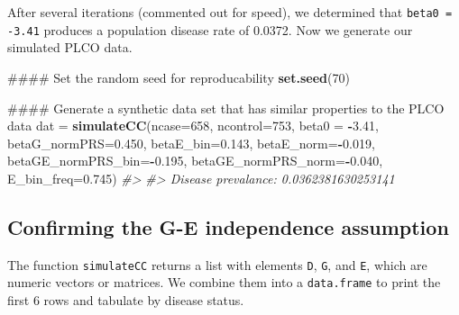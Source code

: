 \documentclass[11pt,]{article}
\newenvironment{Shaded}{\begin{snugshade}}{\end{snugshade}}
\newcommand{\KeywordTok}[1]{\textcolor[rgb]{0.13,0.29,0.53}{\textbf{#1}}}
\newcommand{\DataTypeTok}[1]{\textcolor[rgb]{0.13,0.29,0.53}{#1}}
\newcommand{\DecValTok}[1]{\textcolor[rgb]{0.00,0.00,0.81}{#1}}
\newcommand{\FloatTok}[1]{\textcolor[rgb]{0.00,0.00,0.81}{#1}}
\newcommand{\StringTok}[1]{\textcolor[rgb]{0.31,0.60,0.02}{#1}}
\newcommand{\CommentTok}[1]{\textcolor[rgb]{0.56,0.35,0.01}{\textit{#1}}}
\newcommand{\OperatorTok}[1]{\textcolor[rgb]{0.81,0.36,0.00}{\textbf{#1}}}
\newcommand{\NormalTok}[1]{#1}
\begin{document}
After several iterations (commented out for speed), we determined that
\texttt{beta0 = -3.41} produces a population disease rate of 0.0372. Now
we generate our simulated PLCO data.

\begin{Shaded}
\begin{Highlighting}[]
\NormalTok{#### Set the random seed for reproducability}
\KeywordTok{set.seed}\NormalTok{(}\DecValTok{70}\NormalTok{)}

\NormalTok{#### Generate a synthetic data set that has similar properties to the PLCO data}
\NormalTok{dat =}\StringTok{ }\KeywordTok{simulateCC}\NormalTok{(}\DataTypeTok{ncase=}\DecValTok{658}\NormalTok{, }\DataTypeTok{ncontrol=}\DecValTok{753}\NormalTok{, }\DataTypeTok{beta0 =} \OperatorTok{-}\FloatTok{3.41}\NormalTok{, }\DataTypeTok{betaG_normPRS=}\FloatTok{0.450}\NormalTok{,}
                 \DataTypeTok{betaE_bin=}\FloatTok{0.143}\NormalTok{, }\DataTypeTok{betaE_norm=}\OperatorTok{-}\FloatTok{0.019}\NormalTok{, }\DataTypeTok{betaGE_normPRS_bin=}\OperatorTok{-}\FloatTok{0.195}\NormalTok{,}
                 \DataTypeTok{betaGE_normPRS_norm=}\OperatorTok{-}\FloatTok{0.040}\NormalTok{, }\DataTypeTok{E_bin_freq=}\FloatTok{0.745}\NormalTok{)}
\CommentTok{#> }
\CommentTok{#> Disease prevalance: 0.0362381630253141}
\end{Highlighting}
\end{Shaded}

\subsection{Confirming the G-E independence assumption}

The function \texttt{simulateCC} returns a list with elements
\texttt{D}, \texttt{G}, and \texttt{E}, which are numeric vectors or
matrices. We combine them into a \texttt{data.frame} to print the first
6 rows and tabulate by disease status.

\begin{Shaded}
\end{Shaded}
\end{document}
